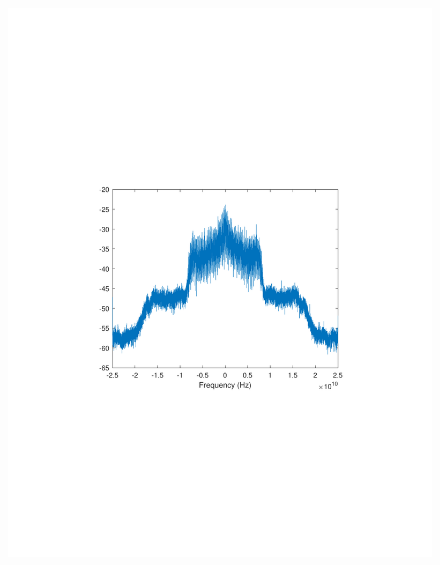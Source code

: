 \begin{refsection}
\begin{figure}[H]
	\centering
	\begin{minipage}{0.30\textwidth}
		\centering
		\includegraphics[clip, trim=4cm 8cm 4cm 8cm, width=1\textwidth]{./sdf/m_qam_system/figures/expResults/homodyne/1_16GBdInSig13dB_AfFec.pdf}
		\label{fig:16GBdEyeAftFec}
	\end{minipage}
	\begin{minipage}{0.30\textwidth}
		\centering

\end{minipage}
\end{figure}
\end{refsection}
